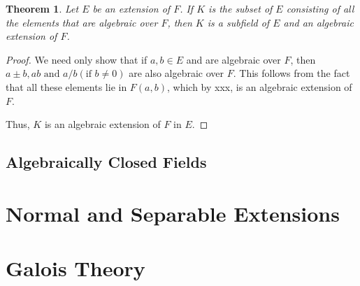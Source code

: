 \documentclass[draft]{article}
\newtheorem{thm}{Theorem}[section]
\theoremstyle{definition}
\theoremstyle{remark}
\begin{document}
            \begin{thm}
                Let $E$ be an extension of $F$. If $K$ is the subset of $E$ consisting of all the elements that are algebraic over $F$, then $K$ is a subfield of $E$ and an algebraic extension of $F$.
            \end{thm}
            
            \begin{proof}
                We need only show that if $a, b \in E$ and are algebraic over $F$, then $a \pm b, ab \text{ and } a/b (\text{if } b \neq 0)$ are also algebraic over $F$. This follows from the fact that all these elements lie in $F(a, b)$, which by xxx, is an algebraic extension of $F$.\par
                Thus, $K$ is an algebraic extension of $F$ in $E$.
            \end{proof}
            
        \subsection{Algebraically Closed Fields}
            
	\section{Normal and Separable Extensions}
	
	\section{Galois Theory}
	
\newpage

    \begin{thebibliography}{10}
    
    	\bibitem{}
    	
    \end{thebibliography}
	
\end{document}
